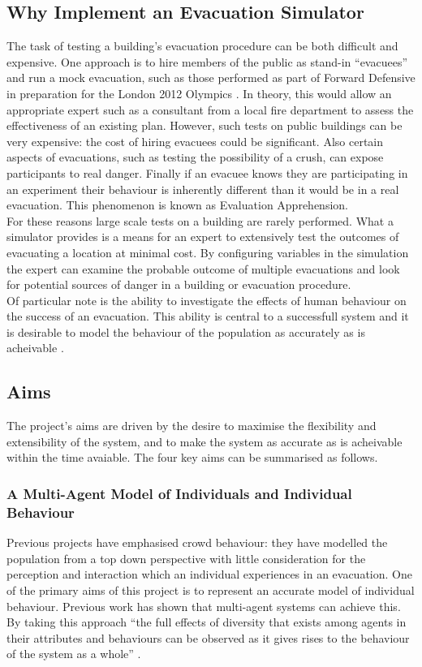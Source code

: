 \subsection{Why Implement an Evacuation Simulator}
The task of testing a building's evacuation procedure can be
both difficult and expensive. One approach is to hire members of the public
as stand-in ``evacuees'' and run a mock evacuation, such as those performed as part of Forward Defensive
in preparation for the London 2012 Olympics \cite{DailyMailEvacuation}. In theory, this would allow an 
appropriate expert such as a consultant from a local fire department to assess the effectiveness
of an existing plan. However, such tests on public buildings can be very expensive: the cost
of hiring evacuees could be significant. Also certain aspects of evacuations, such
as testing the possibility of a crush, can expose participants
to real danger. Finally if an evacuee knows they are participating in an experiment
their behaviour is inherently different than it would be in a real evacuation. This
phenomenon is known as Evaluation Apprehension\cite{EvalApprehension}.\\
For these reasons large scale tests on a building are rarely performed.
What a simulator provides is a means for an expert to extensively test the outcomes of evacuating a location
at minimal cost. By configuring variables in the simulation the expert can examine the probable outcome of multiple evacuations
and look for potential sources of danger in a building or evacuation procedure.\\

Of particular note is the ability to investigate the effects of human behaviour on the success of an evacuation. This ability is central to a successfull system and it is desirable to model the behaviour of the population as accurately as is acheivable \cite{psychology}.


\subsection{Aims}
The project's aims are driven by the desire to maximise the flexibility and extensibility of the system, and to make the system as accurate as is acheivable within the time avaiable. The four key aims can be summarised as follows.

\subsubsection{A Multi-Agent Model of Individuals and Individual Behaviour}
Previous projects have emphasised crowd behaviour: they have modelled the population from a top down 
perspective with little consideration for the perception and interaction which an individual experiences in an evacuation.
One of the primary aims of this project is to represent an accurate model of individual behaviour.
Previous work has shown that multi-agent systems can achieve this. By taking this approach ``the full effects of diversity that exists among agents in their attributes and behaviours can be observed as it
gives rises to the behaviour of the system as a whole'' \cite{AgentBasedTutorial}.

